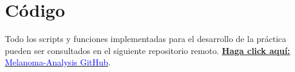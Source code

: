 \section{Código}
Todo los scripts y funciones implementadas para el desarrollo de la práctica pueden ser consultados en el siguiente repositorio remoto. \href{https://github.com/Ramon-OC/Melanoma-Analysis}{\textbf{Haga click aquí: } \textcolor{blue}{Melanoma-Analysis GitHub}}. 